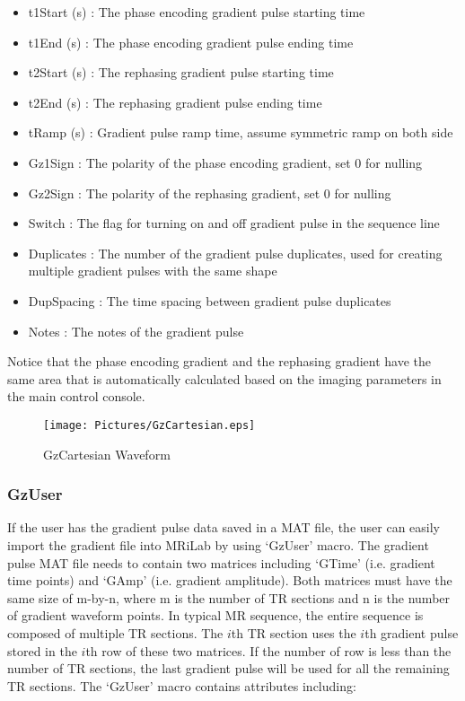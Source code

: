 \documentclass{book}%
\begin{document}
\begin{itemize}
	\item t1Start (s) : The phase encoding gradient pulse starting time
	\item t1End (s) : The phase encoding gradient pulse ending time
	\item t2Start (s) : The rephasing gradient pulse starting time
	\item t2End (s) : The rephasing gradient pulse ending time
	\item tRamp (s) : Gradient pulse ramp time, assume symmetric ramp on both side
	\item Gz1Sign : The polarity of the phase encoding gradient, set 0 for nulling
	\item Gz2Sign : The polarity of the rephasing gradient, set 0 for nulling
	\item Switch : The flag for turning on and off gradient pulse in the sequence line
	\item Duplicates : The number of the gradient pulse duplicates, used for creating multiple gradient pulses with the same shape
	\item DupSpacing : The time spacing between gradient pulse duplicates
	\item Notes : The notes of the gradient pulse 
\end{itemize}

Notice that the phase encoding gradient and the rephasing gradient have the same area that is automatically calculated based on the imaging parameters in the main control console.

\begin{figure}[htbp]
	\centering
		\texttt{[image: Pictures/GzCartesian.eps]}
	\caption{GzCartesian Waveform}
	\label{fig:GzCartesian}
\end{figure}

\subsubsection{GzUser}

If the user has the gradient pulse data saved in a MAT file, the user can easily import the gradient file into MRiLab by using `GzUser' macro. The gradient pulse MAT file needs to contain two matrices including `GTime' (i.e. gradient time points) and `GAmp' (i.e. gradient amplitude). Both matrices must have the same size of m-by-n, where m is the number of TR sections and n is the number of gradient waveform points. In typical MR sequence, the entire sequence is composed of multiple TR sections. The $i$th TR section uses the $i$th gradient pulse stored in the $i$th row of these two matrices. If the number of row is less than the number of TR sections, the last gradient pulse will be used for all the remaining TR sections. The `GzUser' macro contains attributes including:
\end{document}
